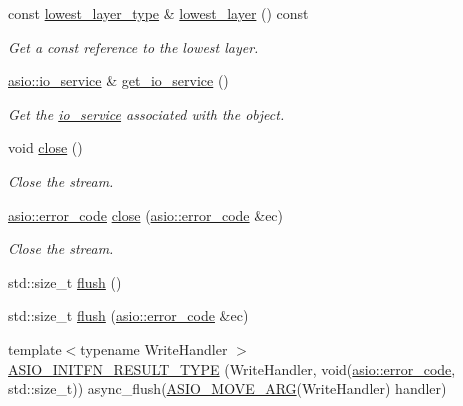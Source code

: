 \begin{DoxyCompactItemize}
const \hyperlink{classasio_1_1buffered__write__stream_af545c11f1e192498c8fa28743590191e}{lowest\+\_\+layer\+\_\+type} \& \hyperlink{classasio_1_1buffered__write__stream_a15d4f3b38ab6b3e137270b7c265464c6}{lowest\+\_\+layer} () const 
\begin{DoxyCompactList}\small\item\em Get a const reference to the lowest layer. \end{DoxyCompactList}\item 
\hyperlink{classasio_1_1io__service}{asio\+::io\+\_\+service} \& \hyperlink{classasio_1_1buffered__write__stream_a3dace57e6be3f5f2cb574b8308da32aa}{get\+\_\+io\+\_\+service} ()
\begin{DoxyCompactList}\small\item\em Get the \hyperlink{classasio_1_1io__service}{io\+\_\+service} associated with the object. \end{DoxyCompactList}\item 
void \hyperlink{classasio_1_1buffered__write__stream_a0879be88d9d9ea9a1212444bfcf410f4}{close} ()
\begin{DoxyCompactList}\small\item\em Close the stream. \end{DoxyCompactList}\item 
\hyperlink{classasio_1_1error__code}{asio\+::error\+\_\+code} \hyperlink{classasio_1_1buffered__write__stream_a231aff9cadd9aa43bb92f003c4034fdd}{close} (\hyperlink{classasio_1_1error__code}{asio\+::error\+\_\+code} \&ec)
\begin{DoxyCompactList}\small\item\em Close the stream. \end{DoxyCompactList}\item 
std\+::size\+\_\+t \hyperlink{classasio_1_1buffered__write__stream_a2974f1b010b5fae2e7c1a359de8a9630}{flush} ()
\item 
std\+::size\+\_\+t \hyperlink{classasio_1_1buffered__write__stream_a8bcdf1dae02dc31c3cc8f190e38ded58}{flush} (\hyperlink{classasio_1_1error__code}{asio\+::error\+\_\+code} \&ec)
\item 
{\footnotesize template$<$typename Write\+Handler $>$ }\\\hyperlink{classasio_1_1buffered__write__stream_ad4774dd7fe28947c1941f30723db03b1}{A\+S\+I\+O\+\_\+\+I\+N\+I\+T\+F\+N\+\_\+\+R\+E\+S\+U\+L\+T\+\_\+\+T\+Y\+P\+E} (Write\+Handler, void(\hyperlink{classasio_1_1error__code}{asio\+::error\+\_\+code}, std\+::size\+\_\+t)) async\+\_\+flush(\hyperlink{classasio_1_1buffered__write__stream_a6d3210026a5f676a7fda22eb27f7d128}{A\+S\+I\+O\+\_\+\+M\+O\+V\+E\+\_\+\+A\+R\+G}(Write\+Handler) handler)

\end{DoxyCompactItemize}
